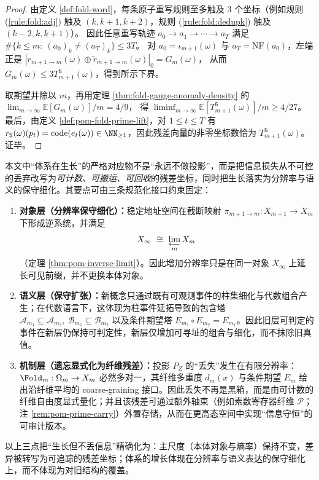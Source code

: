 \begin{proof}
由定义 \ref{def:fold-word}，每条原子重写规则至多触及 $3$ 个坐标（例如规则 (\ref{rule:fold:adj}) 触及 $(k,k{+}1,k{+}2)$，规则 (\ref{rule:fold:dedupk}) 触及 $(k{-}2,k,k{+}1)$）。
因此任意重写轨迹 $a_0\to a_1\to\cdots\to a_T$ 满足
\(
\#\{k\le m:\ (a_0)_k\neq (a_T)_k\}\le 3T
\)。
对 $a_0=\iota_{m+1}(\omega)$ 与 $a_T=\mathrm{NF}(a_0)$，左端正是
\(
|r_{m+1\to m}(\omega)\oplus \widetilde r_{m+1\to m}(\omega)|_0=G_m(\omega)
\)，
从而 $G_m(\omega)\le 3T_{m+1}^{\mathsf S}(\omega)$，得到所示下界。
\par
取期望并除以 $m$，再用定理 \ref{thm:fold-gauge-anomaly-density} 的
\(
\lim_{m\to\infty}\mathbb E[G_m(\omega)]/m=4/9
\)，
得 $\liminf_{m\to\infty}\mathbb E[T_{m+1}^{\mathsf S}(\omega)]/m\ge 4/27$。
最后，由定义 \ref{def:pom-fold-prime-lift}，对 $1\le t\le T$ 有 $r_{\mathsf S}(\omega)(p_t)=\mathrm{code}(e_t(\omega))\in\NN_{\ge 1}$，因此残差向量的非零坐标数恰为 $T_{m+1}^{\mathsf S}(\omega)$。证毕。
\end{proof}\begin{remark}\label{rem:pom-growth-no-loss}
本文中“体系在生长”的严格对应物不是“永远不做投影”，而是把信息损失从不可控的丢弃改写为\emph{可计数、可搬运、可回收}的残差坐标，同时把生长落实为分辨率与语义的保守细化。其要点可由三条规范化接口约束固定：
\begin{enumerate}
  \item \textbf{对象层（分辨率保守细化）：}稳定地址空间在截断映射 \(\pi_{m+1\to m}:X_{m+1}\to X_m\) 下形成逆系统，并满足
  \[
  X_\infty\ \cong\ \varprojlim_m X_m
  \]
  （定理 \ref{thm:pom-inverse-limit}）。因此增加分辨率只是在同一对象 \(X_\infty\) 上延长可见前缀，并不更换本体对象。
  \item \textbf{语义层（保守扩张）：}新概念只通过既有可观测事件的柱集细化与代数组合产生；在代数语言下，这体现为柱事件延拓导致的包含塔
  \(
  \mathcal{A}_{m_1}\subseteq\mathcal{A}_{m_2},\ 
  \mathcal{B}_{m_1}\subseteq\mathcal{B}_{m_2}
  \)
  以及条件期望塔 \(E_{m_1}\circ E_{m_2}=E_{m_1}\)。因此旧层可判定的事件在新层仍保持可判定性，新层仅增加可寻址的组合与细化，而不抹除旧真值。
  \item \textbf{机制层（遗忘显式化为纤维残差）：}投影 \(P_Z\) 的“丢失”发生在有限分辨率：\(\Fold_m:\Omega_m\to X_m\) 必然多对一，其纤维多重度 \(d_m(x)\) 与条件期望 \(E_m\) 给出沿纤维平均的 coarse-graining 接口。因此丢失不再是黑箱，而是由可计数的纤维自由度显式量化；并且该残差可通过额外轴束（例如素数寄存器纤维 \(\mathcal{P}\)；注 \ref{rem:pom-prime-carry}）外置存储，从而在更高态空间中实现“信息守恒”的可审计版本。
\end{enumerate}
以上三点把“生长但不丢信息”精确化为：主尺度（本体对象与熵率）保持不变，差异被转写为可追踪的残差坐标；体系的增长体现在分辨率与语义表达的保守细化上，而不体现为对旧结构的覆盖。
\end{remark}